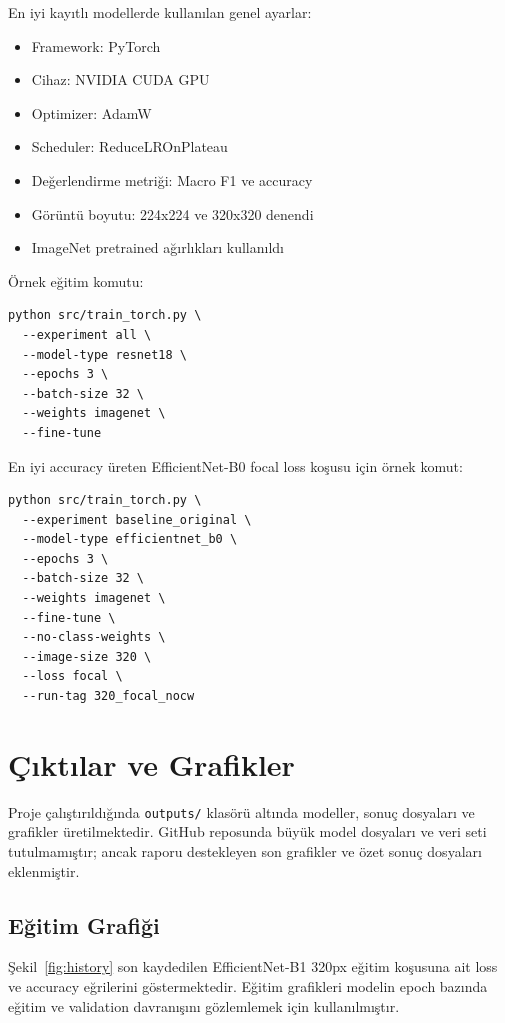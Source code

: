 \documentclass[12pt,a4paper]{article}
\begin{document}
En iyi kayıtlı modellerde kullanılan genel ayarlar:

\begin{itemize}
    \item Framework: PyTorch
    \item Cihaz: NVIDIA CUDA GPU
    \item Optimizer: AdamW
    \item Scheduler: ReduceLROnPlateau
    \item Değerlendirme metriği: Macro F1 ve accuracy
    \item Görüntü boyutu: 224x224 ve 320x320 denendi
    \item ImageNet pretrained ağırlıkları kullanıldı
\end{itemize}

Örnek eğitim komutu:

\begin{verbatim}
python src/train_torch.py \
  --experiment all \
  --model-type resnet18 \
  --epochs 3 \
  --batch-size 32 \
  --weights imagenet \
  --fine-tune
\end{verbatim}

En iyi accuracy üreten EfficientNet-B0 focal loss koşusu için örnek komut:

\begin{verbatim}
python src/train_torch.py \
  --experiment baseline_original \
  --model-type efficientnet_b0 \
  --epochs 3 \
  --batch-size 32 \
  --weights imagenet \
  --fine-tune \
  --no-class-weights \
  --image-size 320 \
  --loss focal \
  --run-tag 320_focal_nocw
\end{verbatim}

\section{Çıktılar ve Grafikler}

Proje çalıştırıldığında \texttt{outputs/} klasörü altında modeller, sonuç dosyaları ve grafikler üretilmektedir. GitHub reposunda büyük model dosyaları ve veri seti tutulmamıştır; ancak raporu destekleyen son grafikler ve özet sonuç dosyaları eklenmiştir.

\subsection{Eğitim Grafiği}

Şekil~\ref{fig:history} son kaydedilen EfficientNet-B1 320px eğitim koşusuna ait loss ve accuracy eğrilerini göstermektedir. Eğitim grafikleri modelin epoch bazında eğitim ve validation davranışını gözlemlemek için kullanılmıştır.
\end{document}
